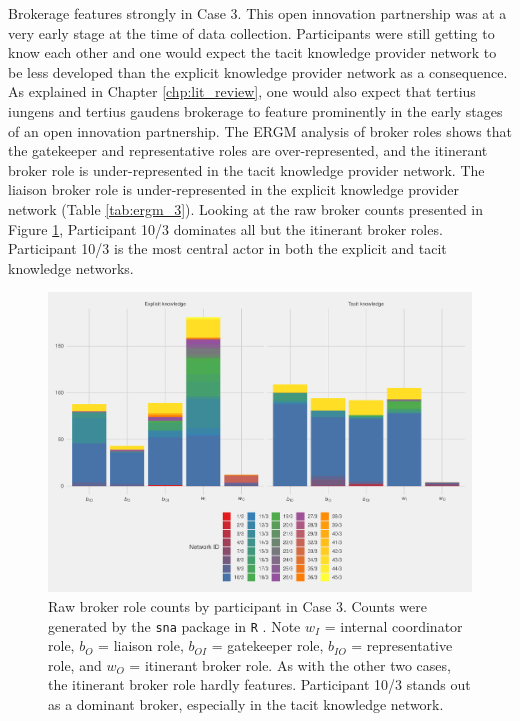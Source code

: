 Brokerage features strongly in Case 3. This open innovation partnership was at a very early stage at the time of data collection. Participants were still getting to know each other and one would expect the tacit knowledge provider network to be less developed than the explicit knowledge provider network as a consequence. As explained in Chapter \ref{chp:lit_review}, one would also expect that tertius iungens and tertius gaudens brokerage to feature prominently in the early stages of an open innovation partnership. The ERGM analysis of broker roles shows that the gatekeeper and representative roles are over-represented, and the itinerant broker role is under-represented in the tacit knowledge provider network. The liaison broker role is under-represented in the explicit knowledge provider network (Table \ref{tab:ergm_3}). Looking at the raw broker counts presented in Figure \ref{fig:gf_c3}, Participant 10/3 dominates all but the itinerant broker roles. Participant 10/3 is the most central actor in both the explicit and tacit knowledge networks.

\begin{figure}[hbt!]
\centering
\includegraphics[width = \textwidth]{Images/gf_case3.pdf}
\caption[Raw broker role counts by participant in Case 3]{Raw broker role counts by participant in Case 3. Counts were generated by the \texttt{sna} package in \texttt{R} \citep{butts2016sna}. Note $w_I$ = internal coordinator role, $b_O$ = liaison role, $b_{OI}$ = gatekeeper role, $b_{IO}$ = representative role, and $w_O$ = itinerant broker role. As with the other two cases, the itinerant broker role hardly features. Participant 10/3 stands out as a dominant broker, especially in the tacit knowledge network.}
\label{fig:gf_c3}
\end{figure}

